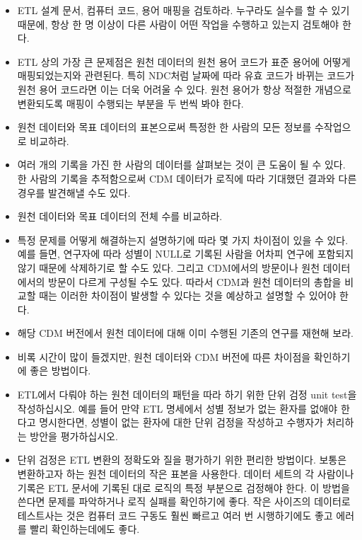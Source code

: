\documentclass[10.5pt]{book}
\providecommand{\tightlist}{%
  \setlength{\itemsep}{0pt}\setlength{\parskip}{0pt}}
\theoremstyle{definition}
\theoremstyle{definition}
\theoremstyle{definition}
\theoremstyle{remark}
\begin{document}
\begin{itemize}
\tightlist
\item
  ETL 설계 문서, 컴퓨터 코드, 용어 매핑을 검토하라. 누구라도 실수를 할
  수 있기 때문에, 항상 한 명 이상이 다른 사람이 어떤 작업을 수행하고
  있는지 검토해야 한다.
\item
  ETL 상의 가장 큰 문제점은 원천 데이터의 원천 용어 코드가 표준 용어에
  어떻게 매핑되었는지와 관련된다. 특히 NDC처럼 날짜에 따라 유효 코드가
  바뀌는 코드가 원천 용어 코드라면 이는 더욱 어려울 수 있다. 원천 용어가
  항상 적절한 개념으로 변환되도록 매핑이 수행되는 부분을 두 번씩 봐야
  한다.
\item
  원천 데이터와 목표 데이터의 표본으로써 특정한 한 사람의 모든 정보를
  수작업으로 비교하라.
\item
  여러 개의 기록을 가진 한 사람의 데이터를 살펴보는 것이 큰 도움이 될 수
  있다. 한 사람의 기록을 추적함으로써 CDM 데이터가 로직에 따라 기대했던
  결과와 다른 경우를 발견해낼 수도 있다.
\item
  원천 데이터와 목표 데이터의 전체 수를 비교하라.
\item
  특정 문제를 어떻게 해결하는지 설명하기에 따라 몇 가지 차이점이 있을 수
  있다. 예를 들면, 연구자에 따라 성별이 NULL로 기록된 사람을 어차피
  연구에 포함되지 않기 때문에 삭제하기로 할 수도 있다. 그리고 CDM에서의
  방문이나 원천 데이터에서의 방문이 다르게 구성될 수도 있다. 따라서
  CDM과 원천 데이터의 총합을 비교할 때는 이러한 차이점이 발생할 수
  있다는 것을 예상하고 설명할 수 있어야 한다.
\item
  해당 CDM 버전에서 원천 데이터에 대해 이미 수행된 기존의 연구를 재현해
  보라.
\item
  비록 시간이 많이 들겠지만, 원천 데이터와 CDM 버전에 따른 차이점을
  확인하기에 좋은 방법이다.
\item
  ETL에서 다뤄야 하는 원천 데이터의 패턴을 따라 하기 위한 단위 검정 unit
  test을 작성하십시오. 예를 들어 만약 ETL 명세에서 성별 정보가 없는
  환자를 없애야 한다고 명시한다면, 성별이 없는 환자에 대한 단위 검정을
  작성하고 수행자가 처리하는 방안을 평가하십시오.
\item
  단위 검정은 ETL 변환의 정확도와 질을 평가하기 위한 편리한 방법이다.
  보통은 변환하고자 하는 원천 데이터의 작은 표본을 사용한다. 데이터
  세트의 각 사람이나 기록은 ETL 문서에 기록된 대로 로직의 특정 부분으로
  검정해야 한다. 이 방법을 쓴다면 문제를 파악하거나 로직 실패를
  확인하기에 좋다. 작은 사이즈의 데이터로 테스트사는 것은 컴퓨터 코드
  구동도 훨씬 빠르고 여러 번 시행하기에도 좋고 에러를 빨리
  확인하는데에도 좋다.
\end{itemize}
\end{document}
